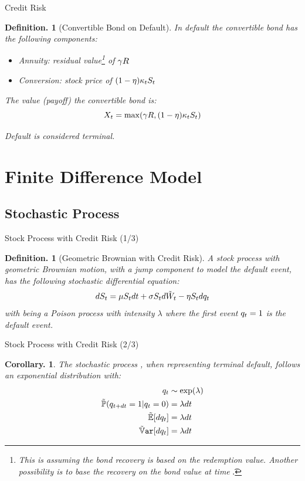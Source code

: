 \documentclass{beamer}
\newtheorem{cor}[thm]{Corollary.}
\newtheorem{defn}[thm]{Definition.}
\begin{document}
\begin{frame}{Credit Risk}
\begin{defn}[Convertible Bond on Default]
In default the convertible bond has the following components:
\begin{itemize}
 \item \emph{Annuity:} residual value\footnote{This is assuming the bond recovery is based on the redemption value.  Another possibility is to base the recovery on the bond value at time \t.} of $\gamma R$
 \item \emph{Conversion:} stock price of $(1 - \eta)\kappa_tS_t$
\end{itemize}

The value (payoff) the convertible bond is:
\begin{equation}
 X_t = \max(\gamma R, (1 - \eta)\kappa_tS_t)
\end{equation}

Default is considered terminal.
\end{defn}
\end{frame}


\section{Finite Difference Model} %


\subsection{Stochastic Process}

\begin{frame}{Stock Process with Credit Risk (1/3)}
\begin{defn}[Geometric Brownian with Credit Risk]
A stock process with geometric Brownian motion, with a jump component to model the default event, has the following stochastic differential equation:
\begin{equation}
 dS_t = \mu S_tdt + \sigma S_td\tilde{W}_t - \eta S_tdq_t
\end{equation}
with \q being a Poison process with intensity $\lambda$ where the first event $q_t = 1$ is the default event.
\end{defn}
\end{frame}

\begin{frame}{Stock Process with Credit Risk (2/3)}
\begin{cor}
The stochastic process \q, when representing terminal default, follows an exponential distribution with:
\begin{align}
 \q                       &\sim \exp(\lambda) \\
 \Prob(\qdt = 1 | \q = 0) &= \lambda\dt \\
 \E[\dq]                  &= \lambda\dt \\
 \Var[\dq]                &= \lambda\dt
\end{align}
\end{cor}
\end{frame}
\end{document}
